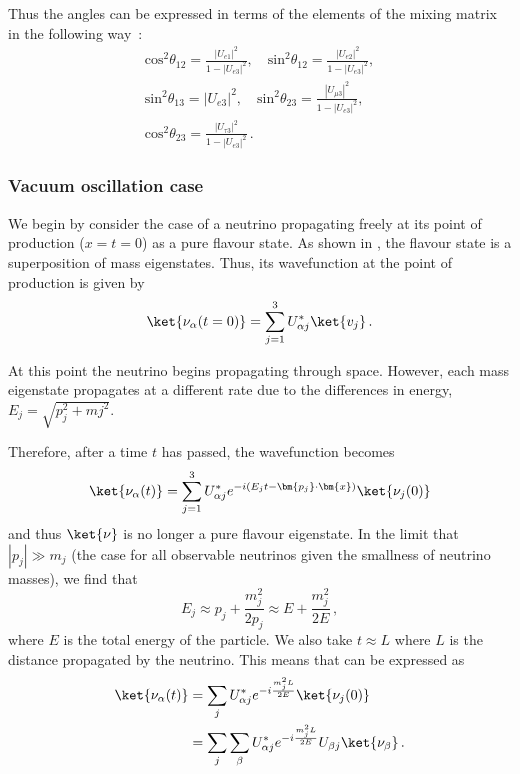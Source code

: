 Thus the angles can be expressed in terms of the elements of the mixing matrix in the following way~\cite{pdg2018}:
\begin{gather*}
  \text{cos}^{2}\theta_{12} = \frac{|U_{e1}|^{2}}{1 - |U_{e3}|^{2}}, \quad \text{sin}^{2}\theta_{12} = \frac{|U_{e2}|^{2}}{1 - |U_{e3}|^{2}}, \\
  \text{sin}^{2}\theta_{13} = |U_{e3}|^{2}, \quad \text{sin}^{2}\theta_{23} = \frac{|U_{\mu 3}|^{2}}{1 - |U_{e3}|^{2}}, \\
  \text{cos}^{2}\theta_{23} = \frac{|U_{\tau 3}|^{2}}{1 - |U_{e3}|^{2}} \, .
\end{gather*}

\subsubsection{Vacuum oscillation case}
\label{sec:theory:theory:vacuum}
We begin by consider the case of a neutrino propagating freely at its point of production ($x=t=0$) as a pure flavour state.
As shown in , the flavour state is a superposition of mass eigenstates.
Thus, its wavefunction at the point of production is given by
\begin{equation}
  \ket{\nu_{\alpha}(t=0)} = \sum_{j=1}^{3} U^{*}_{\alpha j} \ket{v_{j}} \, .
\end{equation}

At this point the neutrino begins propagating through space.
However, each mass eigenstate propagates at a different rate due to the differences in energy, $E_{j} = \sqrt{p_{j}^{2} + m{j}^{2}}$. 

Therefore, after a time $t$ has passed, the wavefunction becomes
\begin{equation}
  \ket{\nu_{\alpha}(t)} = \sum_{j=1}^{3} U^{*}_{\alpha j} e^{-i \left(E_{j}t - \bm{p_{j}} \cdot \bm{x} \right)} \ket{\nu_{j}(0)}
  \label{eq:nuPropagation}
\end{equation}
and thus $\ket{\nu}$ is no longer a pure flavour eigenstate.
In the limit that $|p_{j}| \gg m_{j}$ (the case for all observable neutrinos given the smallness of neutrino masses), we find that
\begin{equation}
  E_{j} \approx p_{j} + \frac{m_{j}^{2}}{2p_{j}} \approx E + \frac{m_{j}^{2}}{2E} \, ,
\end{equation}
where $E$ is the total energy of the particle.
We also take $t \approx L$ where $L$ is the distance propagated by the neutrino.
This means that  can be expressed as
\begin{align}
  \ket{\nu_{\alpha}(t)} &= \sum_{j} U^{*}_{\alpha j} e^{-i \frac{m^{2}_{j}L}{2E}} \ket{\nu_{j}(0)} \\
  &= \sum_{j} \sum_{\beta} U^{*}_{\alpha j} e^{-i \frac{m^{2}_{j}L}{2E}} U_{\beta j} \ket{\nu_{\beta}} \, .
\end{align}

